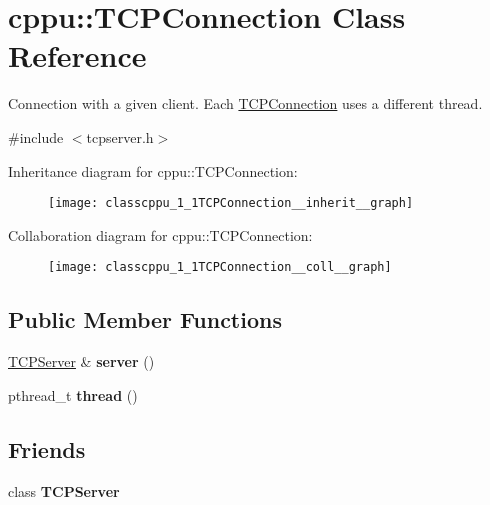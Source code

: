 \hypertarget{classcppu_1_1TCPConnection}{\section{cppu\+:\+:T\+C\+P\+Connection Class Reference}
\label{classcppu_1_1TCPConnection}
}


Connection with a given client. Each \hyperlink{classcppu_1_1TCPConnection}{T\+C\+P\+Connection} uses a different thread.  




{\ttfamily \#include $<$tcpserver.\+h$>$}



Inheritance diagram for cppu\+:\+:T\+C\+P\+Connection\+:
\nopagebreak
\begin{figure}[H]
\begin{center}
\leavevmode
\texttt{[image: classcppu\_1\_1TCPConnection\_\_inherit\_\_graph]}
\end{center}
\end{figure}


Collaboration diagram for cppu\+:\+:T\+C\+P\+Connection\+:
\nopagebreak
\begin{figure}[H]
\begin{center}
\leavevmode
\texttt{[image: classcppu\_1\_1TCPConnection\_\_coll\_\_graph]}
\end{center}
\end{figure}
\subsection*{Public Member Functions}
\begin{DoxyCompactItemize}
\item 
\hypertarget{classcppu_1_1TCPConnection_a4186946c7c22e3c2cebe3a97aa78f5f7}{\hyperlink{classcppu_1_1TCPServer}{T\+C\+P\+Server} \& {\bfseries server} ()}\label{classcppu_1_1TCPConnection_a4186946c7c22e3c2cebe3a97aa78f5f7}

\item 
\hypertarget{classcppu_1_1TCPConnection_a4663875b80fced790502880c72e6e672}{pthread\+\_\+t {\bfseries thread} ()}\label{classcppu_1_1TCPConnection_a4663875b80fced790502880c72e6e672}

\end{DoxyCompactItemize}
\subsection*{Friends}
\begin{DoxyCompactItemize}
\item 
\hypertarget{classcppu_1_1TCPConnection_ae4cfdb1814d91a8d28dadb49adda68f0}{class {\bfseries T\+C\+P\+Server}}\label{classcppu_1_1TCPConnection_ae4cfdb1814d91a8d28dadb49adda68f0}

\end{DoxyCompactItemize}
